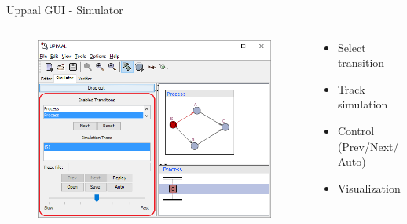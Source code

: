 \documentclass{beamer}
\begin{document}
\begin{frame}{Uppaal GUI - Simulator}
	\vspace{-5mm}
	\begin{columns}
		\begin{column}{0.8\textwidth}
			\begin{figure}[H]
				\includegraphics[scale=0.55]{img/uppaal_gui_small_simulation.png}
			\end{figure}
		\end{column}
		
		\begin{column}{0.35\textwidth}
			\begin{itemize}
				\item Select transition
				\item Track simulation
				\item Control (Prev/Next/Auto)
				\item Visualization
			\end{itemize}
		\end{column}
	\end{columns}		
\end{frame}
\end{document}
